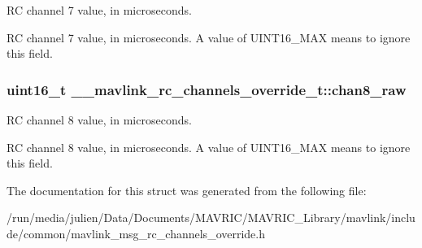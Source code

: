 R\+C channel 7 value, in microseconds. 

R\+C channel 7 value, in microseconds. A value of U\+I\+N\+T16\+\_\+\+M\+A\+X means to ignore this field. \hypertarget{struct____mavlink__rc__channels__override__t_a8028c42950c16d10f196f35df6d32404}{
\subsubsection[{chan8\+\_\+raw}]{\setlength{\rightskip}{0pt plus 5cm}uint16\+\_\+t \+\_\+\+\_\+mavlink\+\_\+rc\+\_\+channels\+\_\+override\+\_\+t\+::chan8\+\_\+raw}}\label{struct____mavlink__rc__channels__override__t_a8028c42950c16d10f196f35df6d32404}


R\+C channel 8 value, in microseconds. 

R\+C channel 8 value, in microseconds. A value of U\+I\+N\+T16\+\_\+\+M\+A\+X means to ignore this field. 

The documentation for this struct was generated from the following file\+:\begin{DoxyCompactItemize}
\item 
/run/media/julien/\+Data/\+Documents/\+M\+A\+V\+R\+I\+C/\+M\+A\+V\+R\+I\+C\+\_\+\+Library/mavlink/include/common/mavlink\+\_\+msg\+\_\+rc\+\_\+channels\+\_\+override.\+h\end{DoxyCompactItemize}
